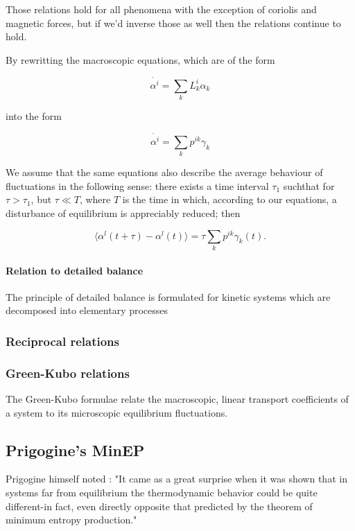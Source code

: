 \documentclass[a4paper,12pt,nofootinbib]{article}
\begin{document}
Those relations hold for all phenomena with the exception of coriolis and magnetic forces, but if we'd inverse those as well then the relations continue to hold.

By rewritting the macroscopic equations, which are of the form

\begin{equation}
  \dot{\alpha^i}= \sum_k L_k^i \alpha_k
\end{equation}

into the form

\begin{equation}
  \dot{\alpha^i}= \sum_k p^{ik} \gamma_k
\end{equation}

We assume that the same equations also describe the average behaviour of fluctuations in the following sense: there exists a time interval $\tau_1$ suchthat for $\tau > \tau_1$, but $\tau \ll T$, where $T$ is the time in which, according to our equations, a disturbance of equilibrium is appreciably reduced; then

\begin{equation}
    \langle \alpha^l(t+\tau)- \alpha^l (t) \rangle = \tau \sum_k p^{ik} \gamma_k(t).
\end{equation}
		

\paragraph{Relation to detailed balance}

The principle of detailed balance is formulated for kinetic systems which are decomposed into elementary processes
\subsubsection{Reciprocal relations}

\subsubsection{Green-Kubo relations}

The Green-Kubo formulae relate the macroscopic, linear transport coefficients of a system to its microscopic equilibrium fluctuations.


\subsection{Prigogine's MinEP}
Prigogine himself noted \cite{Prigogine:1979ul}:
"It came as a great surprise when it was shown that in systems far from equilibrium the thermodynamic behavior could be quite different-in fact, even directly opposite that predicted by the theorem of minimum entropy production."
\end{document}
